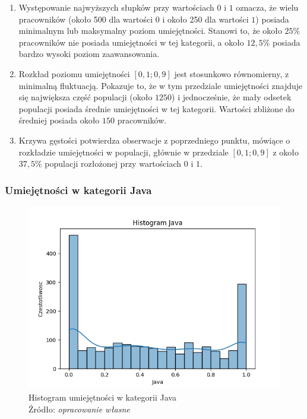         \begin{enumerate}
            \item Występowanie najwyższych słupków przy wartościach $0$ i $1$ oznacza, że wielu pracowników (około 500 dla wartości $0$ i około 250 dla wartości $1$) posiada minimalnym lub maksymalny poziom umiejętności. Stanowi to, że około $25\%$ pracowników nie posiada umiejętności w tej kategorii, a około $12,5\%$ posiada bardzo wysoki poziom zaawansowania.
            \item Rozkład poziomu umiejętności $[0,1; 0,9]$ jest stosunkowo równomierny, z minimalną fluktuacją. Pokazuje to, że w tym przedziale umiejętności znajduje się największa część populacji (około $1250$) i jednocześnie, że mały odsetek populacji posiada średnie umiejętności w tej kategorii. Wartości zbliżone do średniej posiada około $150$ pracowników.
            \item Krzywa gęstości potwierdza obserwacje z poprzedniego punktu, mówiące o rozkładzie umiejętności w populacji, głównie w przedziale $[0,1; 0,9]$ z około $37,5\%$ populacji rozłożonej przy wartościach $0$ i $1$.
        \end{enumerate}
        
        \subsubsection{Umiejętności w kategorii Java}
        \begin{figure}[H]
            \centering
            \includegraphics[width=\linewidth]{chapters/Images/hist_java.png}
            \cprotect\caption{Histogram umiejętności w kategorii Java\\ Źródło:\textit{ opracowanie własne}}
            \label{fig:hist_java}
        \end{figure}

